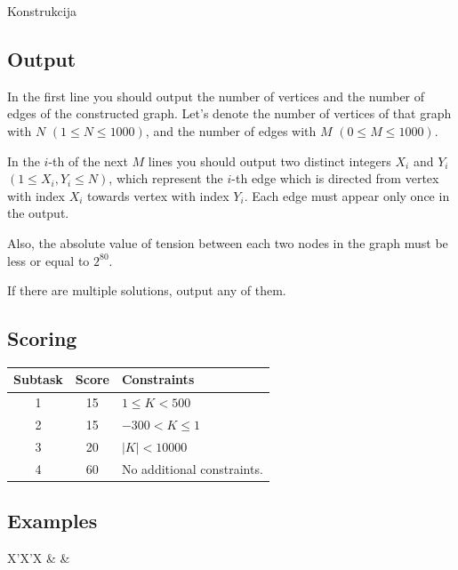 \begin{statement}[
  problempoints=110,
  timelimit=1 sekunda,
  memorylimit=512 MiB,
]{Konstrukcija}
\subsection*{Output}
In the first line you should output the number of vertices and the number of
edges of the constructed graph. Let's denote the number of vertices of that
graph with $N$ $(1 \le N \le 1000)$, and the number of edges with $M$ $(0 \le
M \le 1000)$.

In the $i$-th of the next $M$ lines you should output two distinct integers
$X_i$ and $Y_i$ $(1 \le X_i, Y_i \le N)$, which represent the $i$-th edge which
is directed from vertex with index $X_i$ towards vertex with index $Y_i$. Each
edge must appear only once in the output.

Also, the absolute value of tension between each two nodes in the graph must
be less or equal to $2^{80}$.

If there are multiple solutions, output any of them.

\subsection*{Scoring}
{\renewcommand{\arraystretch}{1.4}
  \setlength{\tabcolsep}{6pt}
  \begin{tabular}{ccl}
 Subtask & Score & Constraints \\ \midrule
  1 & 15 & $1 \le K < 500$ \\
  2 & 15 & $-300 < K \le 1$ \\
  3 & 20 & $|K| < 10000$\\
  4 & 60 & No additional constraints. \\
\end{tabular}}

\subsection*{Examples}
\begin{tabularx}{\textwidth}{X'X'X}
 &
 &
\end{tabularx}


\end{statement}
